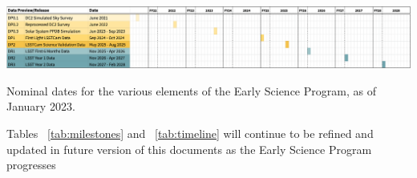 \begin{table}[htb]
\label{tab:timeline}
\includegraphics[width=\linewidth]{figures/DPR-timeline}
\caption{Nominal dates for the various elements of the Early Science Program, as of January 2023.}
\end{table}

Tables ~\ref{tab:milestones} and ~\ref{tab:timeline} will continue to be refined and updated in future version of this documents as the Early Science Program progresses 
